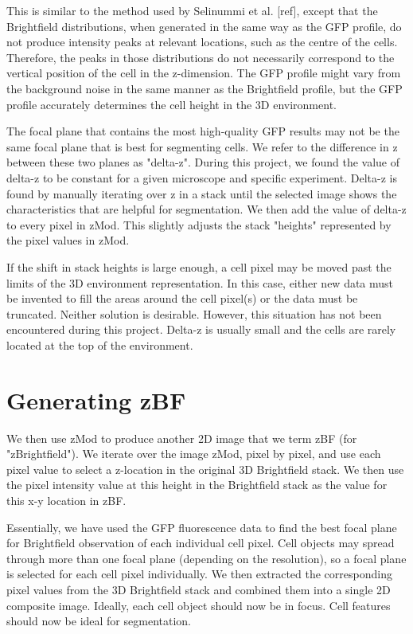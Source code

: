 This is similar to the method used by Selinummi et al. [ref], except that the Brightfield distributions, when generated in the same way as the GFP profile, do not produce intensity peaks at relevant locations, such as the centre of the cells. Therefore, the peaks in those distributions do not necessarily correspond to the vertical position of the cell in the z-dimension. The GFP profile might vary from the background noise in the same manner as the Brightfield profile, but the GFP profile accurately determines the cell height in the 3D environment.

The focal plane that contains the most high-quality GFP results may not be the same focal plane that is best for segmenting cells. We refer to the difference in z between these two planes as "delta-z". During this project, we found the value of delta-z to be constant for a given microscope and specific experiment. Delta-z is found by manually iterating over z in a stack until the selected image shows the characteristics that are helpful for segmentation. We then add the value of delta-z to every pixel in zMod. This slightly adjusts the stack "heights" represented by the pixel values in zMod.

If the shift in stack heights is large enough, a cell pixel may be moved past the limits of the 3D environment representation. In this case, either new data must be invented to fill the areas around the cell pixel(s) or the data must be truncated. Neither solution is desirable. However, this situation has not been encountered during this project. Delta-z is usually small and the cells are rarely located at the top of the environment.

\section{Generating zBF}

We then use zMod to produce another 2D image that we term zBF (for "zBrightfield"). We iterate over the image zMod, pixel by pixel, and use each pixel value to select a z-location in the original 3D Brightfield stack. We then use the pixel intensity value at this height in the Brightfield stack as the value for this x-y location in zBF.

Essentially, we have used the GFP fluorescence data to find the best focal plane for Brightfield observation of each individual cell pixel. Cell objects may spread through more than one focal plane (depending on the resolution), so a focal plane is selected for each cell pixel individually. We then extracted the corresponding pixel values from the 3D Brightfield stack and combined them into a single 2D composite image. Ideally, each cell object should now be in focus. Cell features should now be ideal for segmentation.


